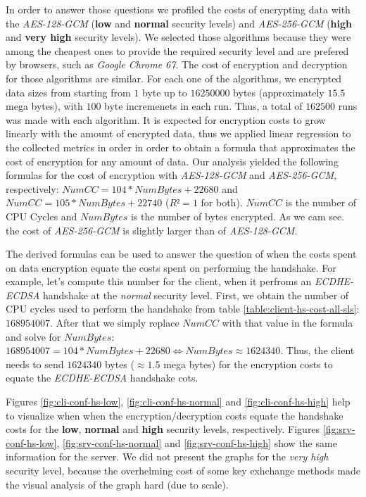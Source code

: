 \documentclass{llncs}
\begin{document}
In order to answer those questions we profiled the costs of encrypting data with the \textit{AES-128-GCM} (\textbf{low} and 
\textbf{normal} security levels) and \textit{AES-256-GCM} (\textbf{high} and \textbf{very high} security levels). 
We selected those algorithms because they were among the cheapest ones to provide the required security level and are prefered by
browsers, such as \textit{Google Chrome 67}. The cost of encryption and decryption for those algorithms are similar\cite{ertaul2016performance}.
For each
one of the algorithms, we encrypted data sizes from starting from $1$ byte up to $16250000$ bytes (approximately $15.5$ mega bytes),
with $100$ byte incremenets in each run. Thus, a total of $162500$ runs was made with each algorithm. It is expected for encryption costs to
grow linearly with the amount of encrypted data, thus we applied linear regression to the collected metrics in order in order to
obtain a formula that approximates the cost of encryption for any amount of data. Our analysis yielded the following formulas for the
cost of encryption with \textit{AES-128-GCM} and \textit{AES-256-GCM}, respectively: $NumCC=104*NumBytes+22680$ and $NumCC=105*NumBytes+22740$ ($R²=1$ for both).
$NumCC$ is the number of CPU Cycles and $NumBytes$ is the number of bytes encrypted. As we cam see. the cost of \textit{AES-256-GCM} is slightly
larger than of \textit{AES-128-GCM}.

The derived formulas can be used to answer the question of when the costs spent on data encryption equate the costs
spent on performing the handshake. For example, let's compute this number for the client, when it perfroms an
\textit{ECDHE-ECDSA} handshake at the \textit{normal} security level. First, we obtain the number of CPU cycles
used to perform the handshake from table \ref{table:client-hs-cost-all-sls}: $168954007$. After that we simply
replace $NumCC$ with that value in the formula and solve for $NumBytes$: $168954007=104*NumBytes+22680 \Leftrightarrow NumBytes \approx 1624340$.
Thus, the client needs to send $1624340$ bytes ($\approx 1.5$ mega bytes) for the encryption costs to equate the \textit{ECDHE-ECDSA} handshake cots.

Figures \ref{fig:cli-conf-hs-low}, \ref{fig:cli-conf-hs-normal} and \ref{fig:cli-conf-hs-high} help to visualize when
when the encryption/decryption costs equate the handshake costs for the \textbf{low}, \textbf{normal} and \textbf{high}
security levels, respectively. Figures \ref{fig:srv-conf-hs-low}, \ref{fig:srv-conf-hs-normal} and \ref{fig:srv-conf-hs-high}
show the same information for the server. We did not present the graphs for the \textit{very high} security level,
because the overhelming cost of some key exhchange methods made the visual analysis of the graph hard (due to scale).
\end{document}

